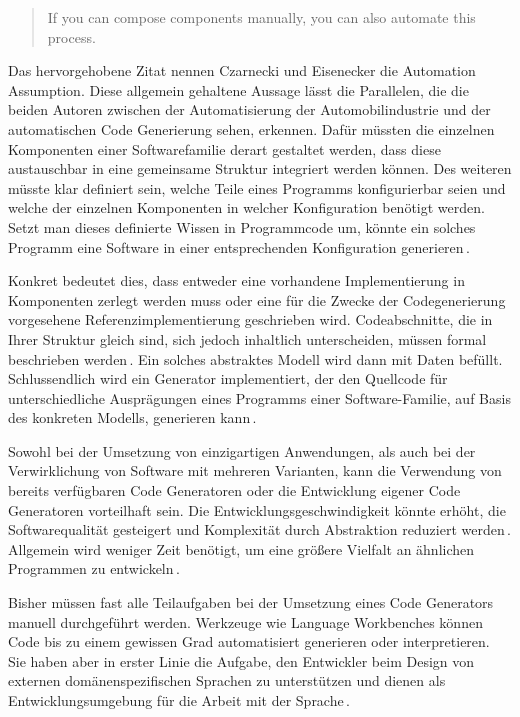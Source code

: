 \documentclass[12pt,oneside,a4paper,parskip]{scrbook}
\begin{document}
\begin{quote}
	\glqq If you can compose components manually, you can also automate this process.\grqq
\end{quote}

Das hervorgehobene Zitat nennen Czarnecki und Eisenecker die Automation Assumption. Diese allgemein gehaltene Aussage lässt die Parallelen, die die beiden Autoren zwischen der Automatisierung der Automobilindustrie und der automatischen Code Generierung sehen, erkennen. Dafür müssten die einzelnen Komponenten einer Softwarefamilie derart gestaltet werden, dass diese austauschbar in eine gemeinsame Struktur integriert werden können. Des weiteren müsste klar definiert sein, welche Teile eines Programms konfigurierbar seien und welche der einzelnen Komponenten in welcher Konfiguration benötigt werden. Setzt man dieses definierte Wissen in Programmcode um, könnte ein solches Programm eine Software in einer entsprechenden Konfiguration generieren\,\cite{czaeis2000}.

Konkret bedeutet dies, dass entweder eine vorhandene Implementierung in Komponenten zerlegt werden muss oder eine für die Zwecke der Codegenerierung vorgesehene Referenzimplementierung geschrieben wird. Codeabschnitte, die in Ihrer Struktur gleich sind, sich jedoch inhaltlich unterscheiden, müssen formal beschrieben werden\,\cite{stahl2007}. Ein solches abstraktes Modell wird dann mit Daten befüllt. Schlussendlich wird ein Generator implementiert, der den Quellcode für unterschiedliche Ausprägungen eines Programms einer Software-Familie, auf Basis des konkreten Modells, generieren kann\,\cite{fowler2010}.

Sowohl bei der Umsetzung von einzigartigen Anwendungen, als auch bei der Verwirklichung von Software mit mehreren Varianten, kann die Verwendung von bereits verfügbaren Code Generatoren oder die Entwicklung eigener Code Generatoren vorteilhaft sein. Die Entwicklungsgeschwindigkeit könnte erhöht, die Softwarequalität gesteigert und Komplexität durch Abstraktion reduziert werden\,\cite{stahl2007}. Allgemein wird weniger Zeit benötigt, um eine größere Vielfalt an ähnlichen Programmen zu entwickeln\,\cite{czaeis2000}.

Bisher müssen fast alle Teilaufgaben bei der Umsetzung eines Code Generators manuell durchgeführt werden. Werkzeuge wie Language Workbenches können Code bis zu einem gewissen Grad automatisiert generieren oder interpretieren. Sie haben aber in erster Linie die Aufgabe, den Entwickler beim Design von externen domänenspezifischen Sprachen zu unterstützen und dienen als Entwicklungsumgebung für die Arbeit mit der Sprache\,\cite{fowler2010}.
\end{document}
